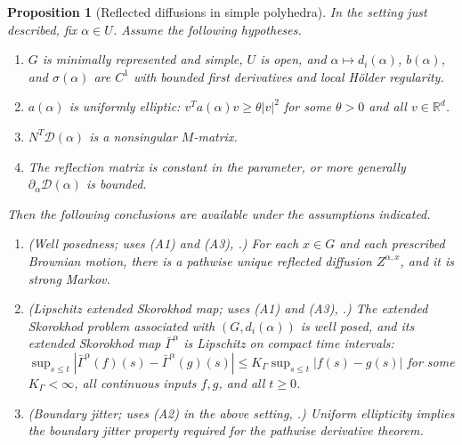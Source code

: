 \documentclass[aihp]{imsart}
\numberwithin{equation}{section}
\theoremstyle{plain}
\newtheorem{proposition}[proposition]{Proposition}
\theoremstyle{definition}
\newcommand{\R}{\mathbb R}
\newcommand{\1}{\mathbf 1}
\newcommand{\abs}[1]{\left\lvert #1\right\rvert}
\begin{document}
\begin{proposition}[Reflected diffusions in simple polyhedra]\label{prop:LR-input}
In the setting just described, fix $\alpha\in U$.  Assume the following
hypotheses.
\begin{enumerate}[label=\textup{(A\arabic*)},leftmargin=2.1em]
\item $G$ is minimally represented and simple, $U$ is open, and
$\alpha\mapsto d_i(\alpha)$, $b(\alpha)$, and $\sigma(\alpha)$ are $C^1$ with
bounded first derivatives and local H\"older regularity.

\item $a(\alpha)$ is uniformly elliptic: $v^Ta(\alpha)v\ge\theta|v|^2$ for some
$\theta>0$ and all $v\in\R^d$.

\item $N^T\mathcal D(\alpha)$ is a nonsingular $M$-matrix.

\item The reflection matrix is constant in the parameter, or more generally
$\partial_\alpha\mathcal D(\alpha)$ is bounded.
\end{enumerate}

Then the following conclusions are available under the assumptions indicated.

\begin{enumerate}[label=\textup{(C\arabic*)},leftmargin=2.1em]
\item \emph{(Well posedness; uses \textup{(A1)} and \textup{(A3)},
\cite[Theorem~2.8]{LipshutzRamanan2021}.)}
For each $x\in G$ and each prescribed Brownian motion, there is a pathwise
unique reflected diffusion $Z^{\alpha,x}$, and it is strong Markov.

\item \emph{(Lipschitz extended Skorokhod map; uses \textup{(A1)} and
\textup{(A3)}, \cite[Proposition~2.6]{LipshutzRamanan2019}.)}
The extended Skorokhod problem associated with $(G,d_i(\alpha))$ is well posed,
and its extended Skorokhod map $\bar\Gamma^\alpha$ is Lipschitz on compact time
intervals: $\sup_{s\le t}\abs{\bar\Gamma^\alpha(f)(s)-\bar\Gamma^\alpha(g)(s)}
\le K_\Gamma\sup_{s\le t}\abs{f(s)-g(s)}$ for some $K_\Gamma<\infty$, all
continuous inputs $f,g$, and all $t\ge0$.

\item \emph{(Boundary jitter; uses \textup{(A2)} in the above setting,
\cite[Theorem~3.3]{LipshutzRamanan2019}.)}
Uniform ellipticity implies the boundary jitter property required for the
pathwise derivative theorem.


\end{enumerate}
\end{proposition}
\end{document}
